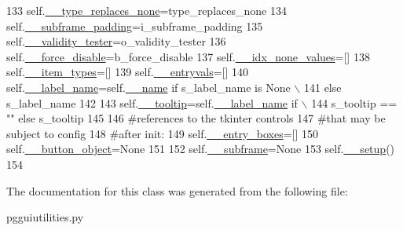 \begin{DoxyCode}
133         self.\hyperlink{classnegui_1_1pgguiutilities_1_1KeyValFrame_ad522d9fdeb611fb4854199a952a782d9}{\_\_type\_replaces\_none}=type\_replaces\_none
134         self.\hyperlink{classnegui_1_1pgguiutilities_1_1KeyValFrame_a7509de20f07f2afdc2bc5fda8bec6c61}{\_\_subframe\_padding}=i\_subframe\_padding
135         self.\hyperlink{classnegui_1_1pgguiutilities_1_1KeyValFrame_a9d31fa82430833c2c2f23e4b28ac95f9}{\_\_validity\_tester}=o\_validity\_tester
136         self.\hyperlink{classnegui_1_1pgguiutilities_1_1KeyValFrame_aecb0c3c8630045b769f6bed4044d658b}{\_\_force\_disable}=b\_force\_disable
137         self.\hyperlink{classnegui_1_1pgguiutilities_1_1KeyValFrame_afbe0c687ff602e5d8e9eff5a410e98b4}{\_\_idx\_none\_values}=[]
138         self.\hyperlink{classnegui_1_1pgguiutilities_1_1KeyValFrame_a7984dc88ccd5c98089c6b9e13d750f31}{\_\_item\_types}=[]
139         self.\hyperlink{classnegui_1_1pgguiutilities_1_1KeyValFrame_a01ff8dc2236ac230d5349d72cc80663e}{\_\_entryvals}=[]
140         self.\hyperlink{classnegui_1_1pgguiutilities_1_1KeyValFrame_a712bc54aa2ed3383fc4fe78943ed2ccb}{\_\_label\_name}=self.\hyperlink{classnegui_1_1pgguiutilities_1_1KeyValFrame_a08a3969c0310f969954e2b7fdd57a440}{\_\_name} \textcolor{keywordflow}{if} s\_label\_name \textcolor{keywordflow}{is} \textcolor{keywordtype}{None} \(\backslash\)
141                                                 \textcolor{keywordflow}{else} s\_label\_name
142 
143         self.\hyperlink{classnegui_1_1pgguiutilities_1_1KeyValFrame_aec6187c09dbe40b76b4452b25a0a141a}{\_\_tooltip}=self.\hyperlink{classnegui_1_1pgguiutilities_1_1KeyValFrame_a712bc54aa2ed3383fc4fe78943ed2ccb}{\_\_label\_name} \textcolor{keywordflow}{if} \(\backslash\)
144                         s\_tooltip == \textcolor{stringliteral}{""} \textcolor{keywordflow}{else} s\_tooltip
145 
146         \textcolor{comment}{#references to the tkinter controls}
147         \textcolor{comment}{#that may be subject to config}
148         \textcolor{comment}{#after init:}
149         self.\hyperlink{classnegui_1_1pgguiutilities_1_1KeyValFrame_aca02061228a06555b1089c0f29e76c16}{\_\_entry\_boxes}=[]
150         self.\hyperlink{classnegui_1_1pgguiutilities_1_1KeyValFrame_a81a445bf0dde094f7a637862633f326d}{\_\_button\_object}=\textcolor{keywordtype}{None}
151 
152         self.\hyperlink{classnegui_1_1pgguiutilities_1_1KeyValFrame_a235e50f36bb184384f5890419a5fbe6b}{\_\_subframe}=\textcolor{keywordtype}{None}
153         self.\hyperlink{classnegui_1_1pgguiutilities_1_1KeyValFrame_a9d6430a9f908364c1f00e07b47dcbff5}{\_\_setup}()
154 
\end{DoxyCode}


The documentation for this class was generated from the following file\+:\begin{DoxyCompactItemize}
\item 
pgguiutilities.\+py\end{DoxyCompactItemize}
